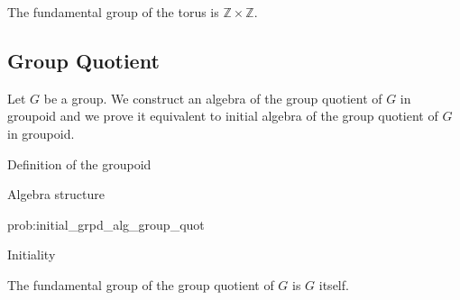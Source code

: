 \begin{corollary}
  The fundamental group of the torus is $\mathbb{Z} \times \mathbb{Z}$.
\end{corollary}

\subsection{Group Quotient}
\label{sec:group_quotient_fund_group}

Let $G$ be a group.  We construct an algebra of the group quotient of $G$ in
groupoid and we prove it equivalent to initial algebra of the group
quotient of $G$ in groupoid.

\begin{definition}
  Definition of the groupoid
\end{definition}

\begin{problem}
  \label{prob:initial_grpd_alg_group_quot}
  Algebra structure
\end{problem}

\begin{construction}{prob:initial_grpd_alg_group_quot}

\end{construction}

\begin{proposition}
  Initiality
\end{proposition}

\begin{corollary}
  The fundamental group of the group quotient of $G$ is $G$ itself.
\end{corollary}
